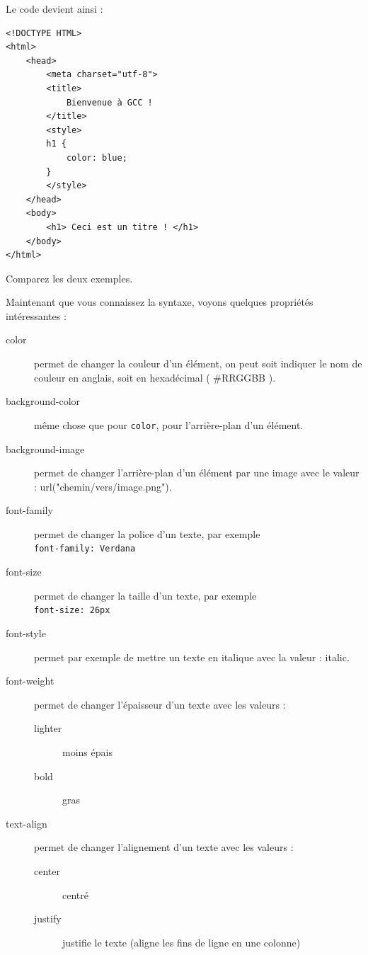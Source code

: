 Le code devient ainsi :

\begin{verbatim}
<!DOCTYPE HTML>
<html>
    <head>
        <meta charset="utf-8">
        <title>
            Bienvenue à GCC !
        </title>
        <style>
        h1 {
            color: blue;
        }
        </style>
    </head>
    <body>
        <h1> Ceci est un titre ! </h1>
    </body>
</html>
\end{verbatim}

\begin{exercise}
  Comparez les deux exemples.
\end{exercise}

Maintenant que vous connaissez la syntaxe, voyons quelques propriétés
intéressantes :

\begin{description}
\item [color] permet de changer la couleur d’un élément, on
  peut soit  indiquer le nom de couleur en anglais, soit en hexadécimal (
  \#RRGGBB ).
\item [background-color] même chose que pour \texttt{color}, pour
  l’arrière-plan d’un élément.
\item [background-image] permet de changer l’arrière-plan
  d’un élément par une image avec le valeur : url("chemin/vers/image.png").
\item [font-family] permet de changer la police d’un texte,
  par exemple\\ \texttt{font-family: Verdana}
\item [font-size] permet de changer la taille d’un texte,
  par exemple\\ \texttt{font-size: 26px}
\item [font-style] permet par exemple de mettre un texte en
  italique avec la valeur : italic.
\item [font-weight] permet de changer l’épaisseur d’un texte
  avec les valeurs :
  \begin{description}
    \item[lighter] moins épais
    \item[bold] gras
  \end{description}
\item [text-align] permet de changer l’alignement d’un texte
  avec les valeurs :
  \begin{description}
  \item[center] centré
  \item[justify] justifie le texte (aligne les fins de ligne en une colonne)

\end{description}
\end{description}
